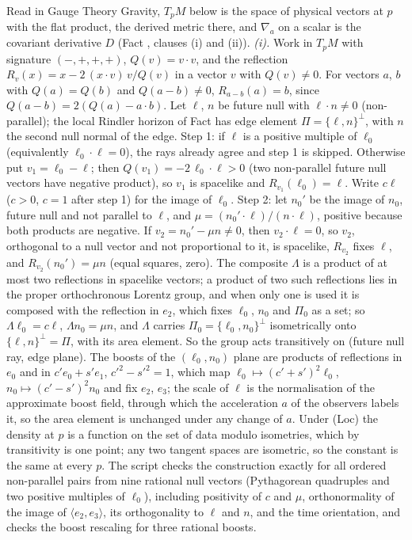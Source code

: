 Read in Gauge Theory Gravity, $T_{p}M$ below is the space of physical vectors at $p$ with the flat product, the derived metric there, and $\nabla_{a}$ on a scalar is the covariant derivative $D$ (Fact , clauses (i) and (ii)). \emph{(i).} Work in $T_{p}M$ with signature $(-,+,+,+)$, $Q(v) = v\cdot v$, and the reflection $R_{v}(x) = x - 2\,(x\cdot v)\,v/Q(v)$ in a vector $v$ with $Q(v) \neq 0$. For vectors $a$, $b$ with $Q(a) = Q(b)$ and $Q(a - b) \neq 0$, $R_{a - b}(a) = b$, since $Q(a - b) = 2(Q(a) - a\cdot b)$. Let $\ell$, $n$ be future null with $\ell\cdot n \neq 0$ (non-parallel); the local Rindler horizon of Fact  has edge element $\Pi = \{\ell, n\}^{\perp}$, with $n$ the second null normal of the edge. Step 1: if $\ell$ is a positive multiple of $\ell_{0}$ (equivalently $\ell_{0}\cdot\ell = 0$), the rays already agree and step 1 is skipped. Otherwise put $v_{1} = \ell_{0} - \ell$; then $Q(v_{1}) = -2\,\ell_{0}\cdot\ell > 0$ (two non-parallel future null vectors have negative product), so $v_{1}$ is spacelike and $R_{v_{1}}(\ell_{0}) = \ell$. Write $c\ell$ ($c > 0$, $c = 1$ after step 1) for the image of $\ell_{0}$. Step 2: let $n_{0}'$ be the image of $n_{0}$, future null and not parallel to $\ell$, and $\mu = (n_{0}'\cdot\ell)/(n\cdot\ell)$, positive because both products are negative. If $v_{2} = n_{0}' - \mu n \neq 0$, then $v_{2}\cdot\ell = 0$, so $v_{2}$, orthogonal to a null vector and not proportional to it, is spacelike, $R_{v_{2}}$ fixes $\ell$, and $R_{v_{2}}(n_{0}') = \mu n$ (equal squares, zero). The composite $\Lambda$ is a product of at most two reflections in spacelike vectors; a product of two such reflections lies in the proper orthochronous Lorentz group, and when only one is used it is composed with the reflection in $e_{2}$, which fixes $\ell_{0}$, $n_{0}$ and $\Pi_{0}$ as a set; so $\Lambda\ell_{0} = c\ell$, $\Lambda n_{0} = \mu n$, and $\Lambda$ carries $\Pi_{0} = \{\ell_{0}, n_{0}\}^{\perp}$ isometrically onto $\{\ell, n\}^{\perp} = \Pi$, with its area element. So the group acts transitively on (future null ray, edge plane). The boosts of the $(\ell_{0}, n_{0})$ plane are products of reflections in $e_{0}$ and in $c'e_{0} + s'e_{1}$, $c'^{2} - s'^{2} = 1$, which map $\ell_{0} \mapsto (c' + s')^{2}\ell_{0}$, $n_{0} \mapsto (c' - s')^{2}n_{0}$ and fix $e_{2}$, $e_{3}$; the scale of $\ell$ is the normalisation of the approximate boost field, through which the acceleration $a$ of the observers labels it, so the area element is unchanged under any change of $a$. Under (Loc) the density at $p$ is a function on the set of data modulo isometries, which by transitivity is one point; any two tangent spaces are isometric, so the constant is the same at every $p$. The script checks the construction exactly for all ordered non-parallel pairs from nine rational null vectors (Pythagorean quadruples and two positive multiples of $\ell_{0}$), including positivity of $c$ and $\mu$, orthonormality of the image of $\langle e_{2}, e_{3}\rangle$, its orthogonality to $\ell$ and $n$, and the time orientation, and checks the boost rescaling for three rational boosts.

